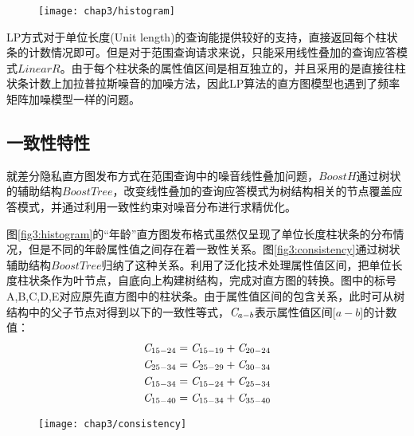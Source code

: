 \begin{figure}[!htp]
	\centering
	\texttt{[image: chap3/histogram]}
\end{figure}

LP方式对于单位长度(Unit length)的查询能提供较好的支持，直接返回每个柱状条的计数情况即可。但是对于范围查询请求来说，只能采用线性叠加的查询应答模式$LinearR$。由于每个柱状条的属性值区间是相互独立的，并且采用的是直接往柱状条计数上加拉普拉斯噪音的加噪方法，因此LP算法的直方图模型也遇到了频率矩阵加噪模型一样的问题。

\subsection{一致性特性}
\label{LP_publish}

就差分隐私直方图发布方式在范围查询中的噪音线性叠加问题，$BoostH$通过树状的辅助结构$BoostTree$，改变线性叠加的查询应答模式为树结构相关的节点覆盖应答模式，并通过利用一致性约束对噪音分布进行求精优化。

图\ref{fig3:histogram}的“年龄”直方图发布格式虽然仅呈现了单位长度柱状条的分布情况，但是不同的年龄属性值之间存在着一致性关系。图\ref{fig3:consistency}通过树状辅助结构$BoostTree$归纳了这种关系。利用了泛化技术处理属性值区间，把单位长度柱状条作为叶节点，自底向上构建树结构，完成对直方图的转换。图中的标号A,B,C,D,E对应原先直方图中的柱状条。由于属性值区间的包含关系，此时可从树结构中的父子节点对得到以下的一致性等式，${\it{C}}_{a-b}$表示属性值区间[$a-b$]的计数值：
\begin{equation}
\label{consistent_equal}
\begin{split}
&{\it{C}}_{15-24} = {\it{C}}_{15-19}+{\it{C}}_{20-24}\\
&{\it{C}}_{25-34} = {\it{C}}_{25-29}+{\it{C}}_{30-34}\\
&{\it{C}}_{15-34} = {\it{C}}_{15-24}+{\it{C}}_{25-34}\\
&{\it{C}}_{15-40} = {\it{C}}_{15-34}+{\it{C}}_{35-40}
\end{split}
\end{equation}

\begin{figure}[!htp]
	\centering
	\texttt{[image: chap3/consistency]}
\end{figure}

